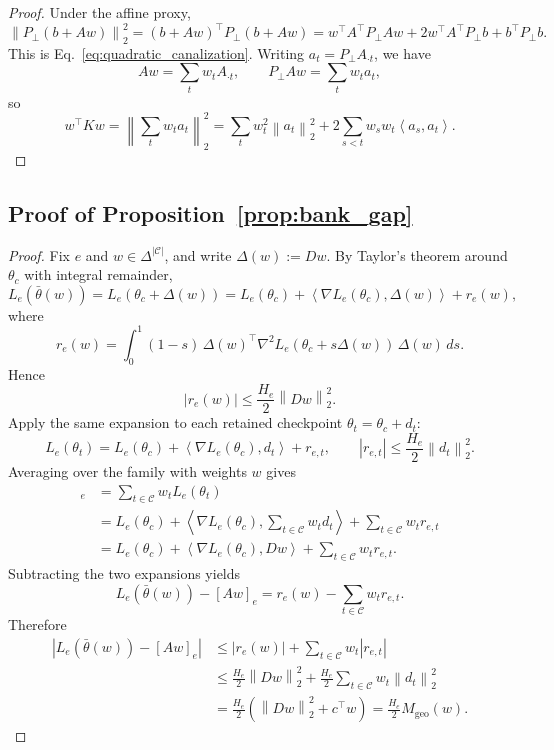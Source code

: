 \documentclass{article}
\theoremstyle{definition}
\newcommand{\cC}{\mathcal{C}}
\newcommand{\simplex}{\Delta}
\newcommand{\norm}[1]{\left\lVert #1 \right\rVert}
\newcommand{\abs}[1]{\left\lvert #1 \right\rvert}
\newcommand{\inner}[2]{\left\langle #1, #2 \right\rangle}
\newcommand{\paren}[1]{\left( #1 \right)}
\newcommand{\thetaw}{\bar{\theta}(w)}
\begin{document}
\begin{proof}
Under the affine proxy,
\[
\norm{P_\perp(b+Aw)}_2^2
=
(b+Aw)^\top P_\perp (b+Aw)
=
w^\top A^\top P_\perp A w + 2 w^\top A^\top P_\perp b + b^\top P_\perp b.
\]
This is Eq.~\eqref{eq:quadratic_canalization}. Writing \(a_t=P_\perp A_{\cdot t}\), we have
\[
Aw = \sum_t w_t A_{\cdot t},
\qquad
P_\perp Aw = \sum_t w_t a_t,
\]
so
\[
w^\top K w
=
\norm{\sum_t w_t a_t}_2^2
=
\sum_t w_t^2 \norm{a_t}_2^2
+ 2\sum_{s<t} w_s w_t \inner{a_s}{a_t}.
\]
\end{proof}

\subsection{Proof of Proposition~\ref{prop:bank_gap}}

\begin{proof}
Fix \(e\) and \(w\in\simplex^{|\cC|}\), and write \(\Delta(w):=Dw\). By Taylor's theorem around \(\theta_c\) with integral remainder,
\[
L_e(\thetaw)
=
L_e(\theta_c+\Delta(w))
=
L_e(\theta_c)+\inner{\nabla L_e(\theta_c)}{\Delta(w)}+r_e(w),
\]
where
\[
r_e(w)
=
\int_0^1 (1-s)\,\Delta(w)^\top \nabla^2 L_e(\theta_c+s\Delta(w))\,\Delta(w)\,ds.
\]
Hence
\[
\abs{r_e(w)}
\le
\frac{H_e}{2}\norm{Dw}_2^2.
\]
Apply the same expansion to each retained checkpoint \(\theta_t=\theta_c+d_t\):
\[
L_e(\theta_t)
=
L_e(\theta_c)+\inner{\nabla L_e(\theta_c)}{d_t}+r_{e,t},
\qquad
\abs{r_{e,t}}
\le
\frac{H_e}{2}\norm{d_t}_2^2.
\]
Averaging over the family with weights \(w\) gives
\begin{align*}
[Aw]_e
&=
\sum_{t\in\cC} w_t L_e(\theta_t) \\
&=
L_e(\theta_c)+\inner{\nabla L_e(\theta_c)}{\sum_{t\in\cC}w_t d_t}+\sum_{t\in\cC} w_t r_{e,t} \\
&=
L_e(\theta_c)+\inner{\nabla L_e(\theta_c)}{Dw}+\sum_{t\in\cC} w_t r_{e,t}.
\end{align*}
Subtracting the two expansions yields
\[
L_e(\thetaw)-[Aw]_e = r_e(w)-\sum_{t\in\cC} w_t r_{e,t}.
\]
Therefore
\begin{align*}
\abs{L_e(\thetaw)-[Aw]_e}
&\le
\abs{r_e(w)}+\sum_{t\in\cC} w_t\abs{r_{e,t}} \\
&\le
\frac{H_e}{2}\norm{Dw}_2^2+\frac{H_e}{2}\sum_{t\in\cC} w_t \norm{d_t}_2^2 \\
&=
\frac{H_e}{2}\paren{\norm{Dw}_2^2+c^\top w}
=
\frac{H_e}{2}M_{\mathrm{geo}}(w).
\end{align*}
\end{proof}
\end{document}
